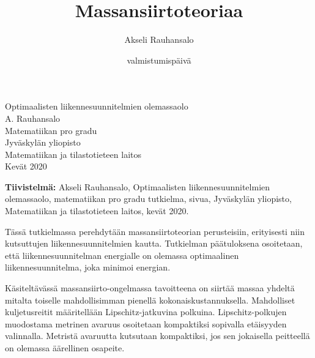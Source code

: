 
\title{Massansiirtoteoriaa}
\author{Akseli Rauhansalo}
\date{valmistumispäivä}


\thispagestyle{empty}                   %
\begin{center}                          %
\null\vspace{3cm}                       %
\Large                                  %
Optimaalisten liikennesuunnitelmien olemassaolo \\[2cm]                     %
\large                                  %
A. Rauhansalo\\[1cm]                    %
\vfill                                  %
\normalsize                             %
Matematiikan pro gradu\\[1cm]           %
Jyväskylän yliopisto\\                  %
Matematiikan ja tilastotieteen laitos\\ %
Kevät 2020                              %
\end{center}                            %
\frontmatter

\noindent
\textbf{Tiivistelmä:} Akseli Rauhansalo, Optimaalisten liikennesuunnitelmien olemassaolo, matematiikan pro gradu tutkielma,  sivua, Jyväskylän yliopisto, Matematiikan ja tilastotieteen laitos, kevät 2020.

\vspace{1pc}
Tässä tutkielmassa perehdytään massansiirtoteorian perusteisiin, erityisesti niin kutsuttujen liikennesuunnitelmien kautta. Tutkielman päätuloksena osoitetaan, että liikennesuunnitelman energialle on olemassa optimaalinen liikennesuunnitelma, joka minimoi energian. 

Käsiteltävässä massansiirto-ongelmassa tavoitteena on siirtää massaa yhdeltä mitalta toiselle mahdollisimman pienellä kokonaiskustannuksella. Mahdolliset kuljetusreitit määritellään Lipschitz-jatkuvina polkuina. Lipschitz-polkujen muodostama metrinen avaruus osoitetaan kompaktiksi sopivalla etäisyyden valinnalla. Metristä avaruutta kutsutaan kompaktiksi, jos sen jokaisella peitteellä on olemassa äärellinen osapeite. 


